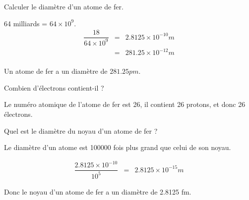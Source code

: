 \begin{questions}
	\question[2] Calculer le diamètre d'un atome de fer.
	\fillwithdottedlines{2cm}
	\begin{solution}
		64 milliards  = $64 \times 10^9$.
		\begin{eqnarray*}
			\dfrac{18}{64 \times 10^9}& = & \num{2.8125} \times 10^{-10} m \\
			& = & \num{281.25} \times 10^{-12} m \\
		\end{eqnarray*}
	\end{solution}
	Un atome de fer a un diamètre de $\num{281.25} pm$.  
	
	\question[1] Combien d'électrons contient-il ?
	\fillwithdottedlines{2cm}
	\begin{solution}
		Le numéro atomique de l'atome de fer est 26, il contient 26 protons, et donc 26 électrons.
	\end{solution}
	
	\question[1] Quel est le diamètre du noyau d'un atome de fer ?
	\fillwithdottedlines{3cm}
	\begin{solution}
		Le diamètre d'un atome est \num{100000} fois plus grand que celui de son noyau.
		
		\begin{eqnarray*}
			\dfrac{\num{2.8125} \times 10^{-10}}{10^5}& = & \num{2.8125} \times 10^{-15} m
		\end{eqnarray*}
	
	Donc le noyau d'un atome de fer a un diamètre de \num{2.8125} fm.
	\end{solution}
\end{questions}

